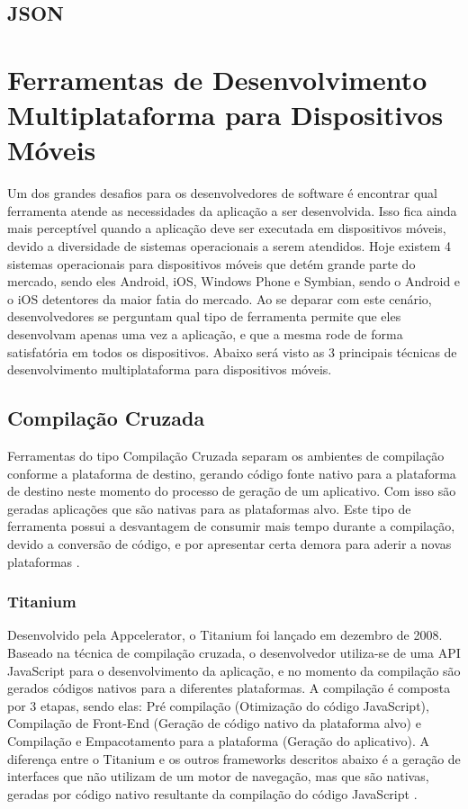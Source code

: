 \subsection{JSON}

\section{Ferramentas de Desenvolvimento Multiplataforma para Dispositivos Móveis}
Um dos grandes desafios para os desenvolvedores de software é encontrar qual ferramenta atende as necessidades da aplicação a ser desenvolvida. Isso fica ainda mais perceptível quando a aplicação deve ser executada em dispositivos móveis, devido a diversidade de sistemas operacionais a serem atendidos. Hoje existem 4 sistemas operacionais para dispositivos móveis que detém grande parte do mercado, sendo eles Android, iOS, Windows Phone e Symbian, sendo o Android e o iOS detentores da maior fatia do mercado. Ao se deparar com este cenário, desenvolvedores se perguntam qual tipo de ferramenta permite que eles desenvolvam apenas uma vez a aplicação, e que a mesma rode de forma satisfatória em todos os dispositivos. Abaixo será visto as 3 principais técnicas de desenvolvimento multiplataforma para dispositivos móveis\cite{CrossPlatformMobileDevelopment2011}.

\subsection{Compilação Cruzada}
Ferramentas do tipo Compilação Cruzada separam os ambientes de compilação conforme a plataforma de destino, gerando código fonte nativo para a plataforma de destino neste momento do processo de geração de um aplicativo. Com isso são geradas aplicações que são nativas para as plataformas alvo. Este tipo de ferramenta possui a desvantagem de consumir mais tempo durante a compilação, devido a conversão de código, e por apresentar certa demora para aderir a novas plataformas
\cite{CrossPlatformMobileDevelopment2011}.

\subsubsection{Titanium}
Desenvolvido pela Appcelerator, o Titanium foi lançado em dezembro de 2008. Baseado na técnica de compilação cruzada, o desenvolvedor utiliza-se de uma API JavaScript para o desenvolvimento da aplicação, e no momento da compilação são gerados códigos nativos para a diferentes plataformas. A compilação é composta por 3 etapas, sendo elas: Pré compilação (Otimização do código JavaScript), Compilação de Front-End (Geração de código nativo da plataforma alvo) e Compilação e Empacotamento para a plataforma (Geração do aplicativo). A diferença entre o Titanium e os outros frameworks descritos abaixo é a geração de interfaces que não utilizam de um motor de navegação, mas que são nativas, geradas por código nativo resultante da compilação do código JavaScript
\cite{CrossPlatformMobileDevelopment2011}.

